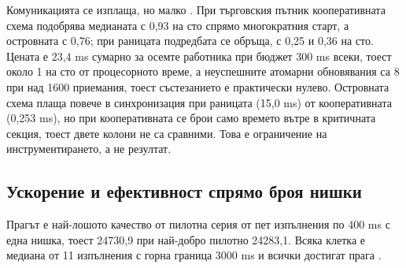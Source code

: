 Комуникацията се изплаща, но малко . При търговския пътник кооперативната схема
подобрява медианата с 0,93 на сто спрямо многократния старт, а островната с 0,76; при раницата
подредбата се обръща, с 0,25 и 0,36 на сто. Цената е 23,4 ms сумарно за осемте работника при бюджет
300 ms всеки, тоест около 1 на сто от процесорното време, а неуспешните атомарни обновявания са 8
при над 1600 приемания, тоест състезанието е практически нулево. Островната схема плаща повече в
синхронизация при раницата (15,0 ms) от кооперативната (0,253 ms), но при кооперативната се брои
само времето вътре в критичната секция, тоест двете колони не са сравними. Това е ограничение на
инструментирането, а не резултат.

\subsection{Ускорение и ефективност спрямо броя нишки}
\label{subsec:res-speedup}

Прагът е най-лошото качество от пилотна серия от пет изпълнения по 400 ms с една нишка, тоест
24730,9 при най-добро пилотно 24283,1. Всяка клетка е медиана от 11 изпълнения с горна граница
3000 ms и всички достигат прага .

